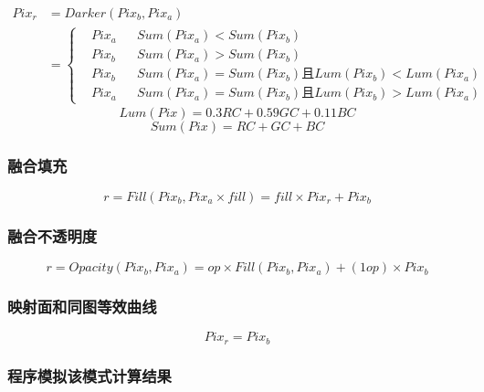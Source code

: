 $$\begin{aligned}
	Pix_r &=Darker(Pix_b,Pix_a)\\&=\left\{\begin{aligned}&Pix_a && Sum(Pix_a)<Sum(Pix_b)\\&Pix_b&&  Sum(Pix_a)>Sum(Pix_b)\\&Pix_b&&  Sum(Pix_a)=Sum(Pix_b)且Lum(Pix_b)<Lum(Pix_a)\\&Pix_a&&  Sum(Pix_a)=Sum(Pix_b)且Lum(Pix_b)>Lum(Pix_a)\end{aligned}\right.
\end{aligned}$$
$$Lum(Pix) = 0.3RC+0.59GC+0.11BC$$
$$Sum(Pix) = RC+GC+BC$$

\subsubsection{ 融合填充}

$$r= Fill(Pix_b,Pix_a\times fill) =fill\times Pix_r + Pix_b$$

\subsubsection{ 融合不透明度}

$$r=Opacity(Pix_b,Pix_a)=op\times Fill(Pix_b,Pix_a)+(1op)\times Pix_b $$

\subsubsection{ 映射面和同图等效曲线}

$$Pix_r=Pix_b$$

\subsubsection{ 程序模拟该模式计算结果}

